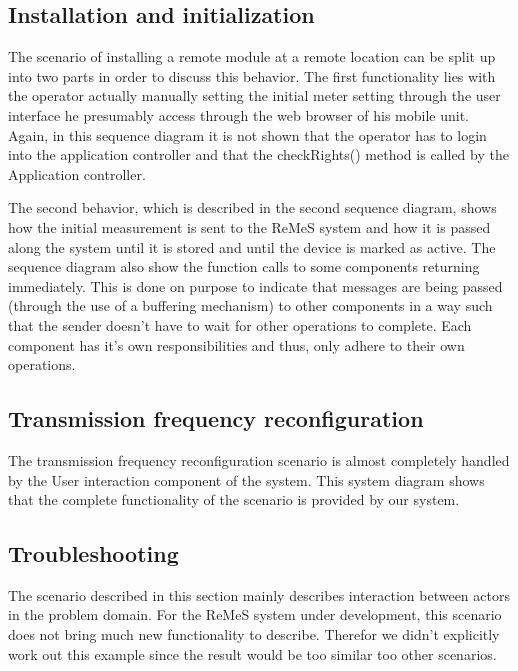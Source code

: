 \subsection{Installation and initialization}
The scenario of installing a remote module at a remote location can be split up into two parts in order to discuss
this behavior. The first functionality lies with the operator actually manually setting the initial meter setting
through the user interface he presumably access through the web browser of his mobile unit. Again, in this sequence
diagram it is not shown that the operator has to login into the application controller and that the checkRights()
method is called by the Application controller.

The second behavior, which is described in the second sequence diagram, shows how the initial measurement is sent to
the ReMeS system and how it is passed along the system until it is stored and until the device is marked as active.
The sequence diagram also show the function calls to some components returning immediately. This is done on purpose 
to indicate that messages are being passed (through the use of a buffering mechanism) to other components in a way such
that the sender doesn't have to wait for other operations to complete. Each component has it's own responsibilities and 
thus, only adhere to their own operations. 
\subsection{Transmission frequency reconfiguration}
The transmission frequency reconfiguration scenario is almost completely handled by the User interaction component of the system.
This system diagram shows that the complete functionality of the scenario is provided by our system.
\subsection{Troubleshooting}
The scenario described in this section mainly describes interaction between actors in the problem domain.
For the ReMeS system under development, this scenario does not bring much new functionality to describe. 
Therefor we didn't explicitly work out this example since the result would be too similar too other scenarios.
